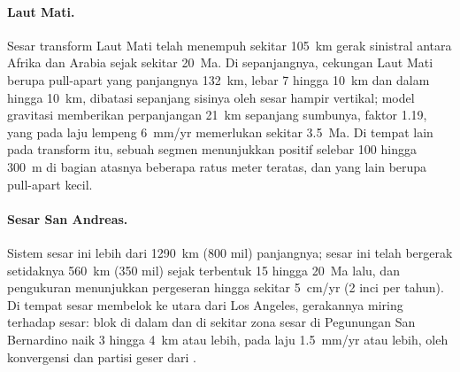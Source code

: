 \paragraph{Laut Mati.} Sesar transform Laut Mati telah menempuh sekitar
\qty{105}{km} gerak sinistral antara Afrika dan Arabia sejak sekitar
\qty{20}{Ma}. Di sepanjangnya, cekungan Laut Mati berupa pull-apart yang panjangnya \qty{132}{km},
lebar 7 hingga \qty{10}{km} dan dalam hingga \qty{10}{km}, dibatasi sepanjang
sisinya oleh sesar hampir vertikal; model gravitasi memberikan perpanjangan \qty{21}{km}
sepanjang sumbunya, faktor 1.19, yang pada laju lempeng
\qty{6}{mm/yr} memerlukan sekitar \qty{3.5}{Ma}. Di tempat lain pada transform itu, sebuah
segmen menunjukkan  positif selebar 100 hingga \qty{300}{m} di bagian atasnya
beberapa ratus meter teratas, dan yang lain berupa pull-apart kecil.

\paragraph{Sesar San Andreas.} Sistem sesar ini lebih dari \qty{1290}{km}
(800 mil) panjangnya; sesar ini telah bergerak setidaknya \qty{560}{km} (350 mil) sejak
terbentuk 15 hingga \qty{20}{Ma} lalu, dan pengukuran menunjukkan pergeseran hingga sekitar
\qty{5}{cm/yr} (2 inci per tahun). Di tempat sesar membelok ke utara dari Los Angeles,
gerakannya miring terhadap sesar: blok di dalam dan di sekitar zona sesar di
Pegunungan San Bernardino naik 3 hingga \qty{4}{km} atau lebih, pada
laju \qty{1.5}{mm/yr} atau lebih, oleh konvergensi dan partisi geser dari
.

